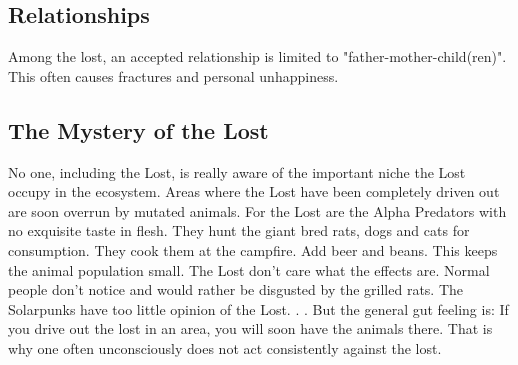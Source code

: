 \subsection{Relationships}
Among the lost, an accepted relationship is limited to "father-mother-child(ren)". This often causes fractures and personal unhappiness.

\subsection{The Mystery of the Lost}
No one, including the Lost, is really aware of the important niche the Lost occupy in the ecosystem. Areas where the Lost have been completely driven out are soon overrun by mutated animals.
For the Lost are the Alpha Predators with no exquisite taste in flesh. They hunt the giant bred rats, dogs and cats for consumption. They cook them at the campfire. Add beer and beans.
This keeps the animal population small. The Lost don't care what the effects are. Normal people don't notice and would rather be disgusted by the grilled rats. The Solarpunks have too little opinion of the Lost. . .
But the general gut feeling is: If you drive out the lost in an area, you will soon have the animals there.
That is why one often unconsciously does not act consistently against the lost.